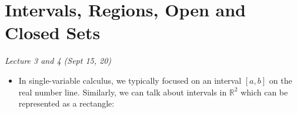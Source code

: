 \section{Intervals, Regions, Open and Closed Sets}
\textit{Lecture 3 and 4 (Sept 15, 20)}
\begin{itemize}
    \item In single-variable calculus, we typically focused on an interval $[a,b]$ on the real number line. Similarly, we can talk about intervals in $\mathbb{R}^2$ which can be represented as a rectangle:
          \begin{center}
\end{center}
\end{itemize}
